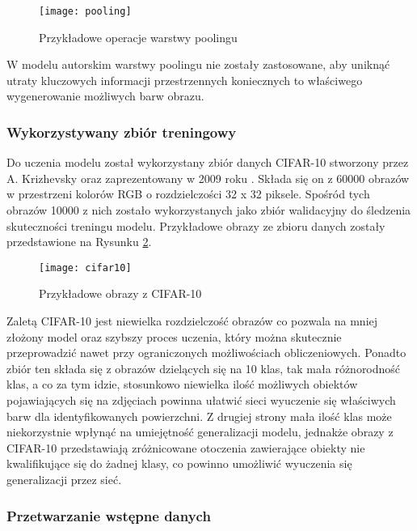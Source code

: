   \begin{figure}[h]
   \centering
   \texttt{[image: pooling]}
   \caption[Przykładowe operacje warstwy poolingu - źródło: Rysunek własny]{Przykładowe operacje warstwy poolingu}
   \label{fig:pooling}
  \end{figure}

  W modelu autorskim warstwy poolingu nie zostały zastosowane, aby uniknąć utraty
  kluczowych informacji przestrzennych koniecznych to właściwego wygenerowanie
  możliwych barw obrazu.

\subsubsection{Wykorzystywany zbiór treningowy}

  Do uczenia modelu został wykorzystany zbiór danych CIFAR-10 stworzony przez
  A. Krizhevsky oraz zaprezentowany w 2009 roku \cite{cifar-10}.
  Składa się on z 60000 obrazów w przestrzeni kolorów RGB o rozdzielczości 32 x 32 piksele.
  Spośród tych obrazów 10000 z nich zostało wykorzystanych jako zbiór
  walidacyjny do śledzenia skuteczności treningu modelu. Przykładowe obrazy
  ze zbioru danych zostały przedstawione na Rysunku \ref{fig:cifar10}.

  \begin{figure}[h]
   \centering
   \texttt{[image: cifar10]}
   \caption[Przykładowe obrazy z CIFAR-10 - źródło: Rysunek własny]
   {Przykładowe obrazy z CIFAR-10}
   \label{fig:cifar10}
  \end{figure}

  Zaletą CIFAR-10 jest niewielka rozdzielczość obrazów co pozwala na mniej
  złożony model oraz szybszy proces uczenia, który można skutecznie przeprowadzić
  nawet przy ograniczonych możliwościach obliczeniowych. Ponadto zbiór ten składa
  się z obrazów dzielących się na 10 klas, tak mała różnorodność klas, a co za
  tym idzie, stosunkowo niewielka ilość możliwych obiektów pojawiających się
  na zdjęciach powinna ułatwić sieci wyuczenie się właściwych barw dla
  identyfikowanych powierzchni. Z drugiej strony mała ilość klas może niekorzystnie
  wpłynąć na umiejętność generalizacji modelu, jednakże obrazy z CIFAR-10
  przedstawiają zróżnicowane otoczenia zawierające obiekty nie kwalifikujące
  się do żadnej klasy, co powinno umożliwić wyuczenia się generalizacji przez
  sieć.

\subsubsection{Przetwarzanie wstępne danych} \label{Przetwarzanie wstępne danych}

